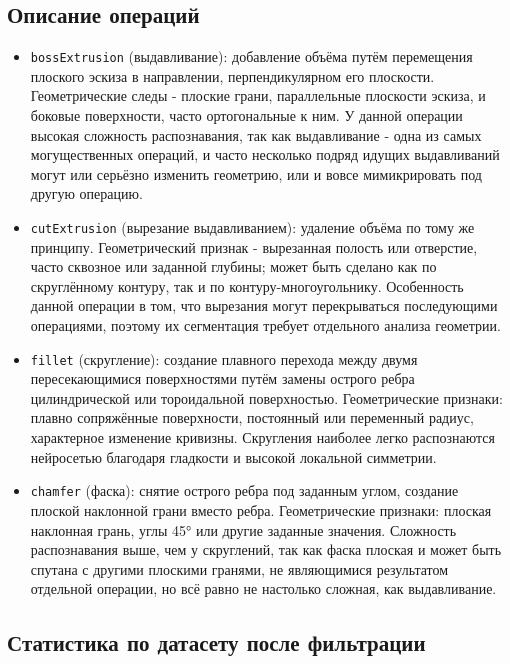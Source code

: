 \subsection{Описание операций}

\begin{itemize}
    \item \texttt{bossExtrusion} (выдавливание): добавление объёма путём перемещения плоского эскиза в направлении, перпендикулярном его плоскости. Геометрические следы - плоские грани, параллельные плоскости эскиза, и боковые поверхности, часто ортогональные к ним. У данной операции высокая сложность распознавания, так как выдавливание - одна из самых могущественных операций, и часто несколько подряд идущих выдавливаний могут или серьёзно изменить геометрию, или и вовсе мимикрировать под другую операцию.
    
    \item \texttt{cutExtrusion} (вырезание выдавливанием): удаление объёма по тому же принципу. Геометрический признак - вырезанная полость или отверстие, часто сквозное или заданной глубины; может быть сделано как по скруглённому контуру, так и по контуру-многоугольнику. Особенность данной операции в том, что вырезания могут перекрываться последующими операциями, поэтому их сегментация требует отдельного анализа геометрии.
    
    \item \texttt{fillet} (скругление): создание плавного перехода между двумя пересекающимися поверхностями путём замены острого ребра цилиндрической или тороидальной поверхностью. Геометрические признаки: плавно сопряжённые поверхности, постоянный или переменный радиус, характерное изменение кривизны. Скругления наиболее легко распознаются нейросетью благодаря гладкости и высокой локальной симметрии.
    
    \item \texttt{chamfer} (фаска): снятие острого ребра под заданным углом, создание плоской наклонной грани вместо ребра. Геометрические признаки: плоская наклонная грань, углы 45° или другие заданные значения. Сложность распознавания выше, чем у скруглений, так как фаска плоская и может быть спутана с другими плоскими гранями, не являющимися результатом отдельной операции, но всё равно не настолько сложная, как выдавливание.
\end{itemize}

\subsection{Статистика по датасету после фильтрации}


